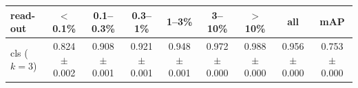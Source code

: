 \begin{tabular}{lcccccccc}
\toprule
read-out & $<$0.1\% & 0.1--0.3\% & 0.3--1\% & 1--3\% & 3--10\% & $>$10\% & all & mAP \\
\midrule
cls ($k=3$) & 0.824 $\pm$ 0.002 & 0.908 $\pm$ 0.001 & 0.921 $\pm$ 0.001 & 0.948 $\pm$ 0.001 & 0.972 $\pm$ 0.000 & 0.988 $\pm$ 0.000 & 0.956 $\pm$ 0.000 & 0.753 $\pm$ 0.000 \\
\bottomrule
\end{tabular}
